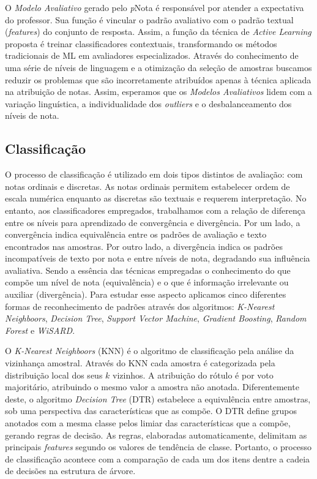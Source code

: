 O \textit{Modelo Avaliativo} gerado pelo \textit{p}Nota é responsável por atender a expectativa do professor. Sua função é vincular o padrão avaliativo com o padrão textual (\textit{features}) do conjunto de resposta. Assim, a função da técnica de \textit{Active Learning} proposta é treinar classificadores contextuais, transformando os métodos tradicionais de ML em avaliadores especializados. Através do conhecimento de uma série de níveis de linguagem e a otimização da seleção de amostras buscamos reduzir os problemas que são incorretamente atribuídos apenas à técnica aplicada na atribuição de notas. Assim, esperamos que os \textit{Modelos Avaliativos} lidem com a variação linguística, a individualidade dos \textit{outliers} e o desbalanceamento dos níveis de nota.


\subsection{Classificação}
\label{subsec-classificacao}

O processo de classificação é utilizado em dois tipos distintos de avaliação: com notas ordinais e discretas. As notas ordinais permitem estabelecer ordem de escala numérica enquanto as discretas são textuais e requerem interpretação. No entanto, aos classificadores empregados, trabalhamos com a relação de diferença entre os níveis para aprendizado de convergência e divergência. Por um lado, a convergência indica equivalência entre os padrões de avaliação e texto encontrados nas amostras. Por outro lado, a divergência indica os padrões incompatíveis de texto por nota e entre níveis de nota, degradando sua influência avaliativa. Sendo a essência das técnicas empregadas o conhecimento do que compõe um nível de nota (equivalência) e o que é informação irrelevante ou auxiliar (divergência). Para estudar esse aspecto aplicamos cinco diferentes formas de reconhecimento de padrões através dos algoritmos: \textit{K-Nearest Neighboors}, \textit{Decision Tree}, \textit{Support Vector Machine}, \textit{Gradient Boosting}, \textit{Random Forest} e \textit{WiSARD}.

O \textit{K-Nearest Neighboors} (KNN) é o algoritmo de classificação pela análise da vizinhança amostral. Através do KNN cada amostra é categorizada pela distribuição local dos seus $ k $ vizinhos. A atribuição do rótulo é por voto majoritário, atribuindo o mesmo valor a amostra não anotada. Diferentemente deste, o algoritmo \textit{Decision Tree} (DTR) estabelece a equivalência entre amostras, sob uma perspectiva das características que as compõe. O DTR define grupos anotados com a mesma classe pelos limiar das características que a compõe, gerando regras de decisão. As regras, elaboradas automaticamente, delimitam as principais \textit{features} segundo os valores de tendência de classe. Portanto, o processo de classificação acontece com a comparação de cada um dos itens dentre a cadeia de decisões na estrutura de árvore.

